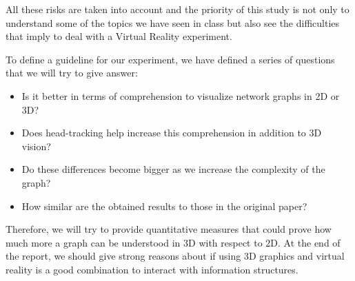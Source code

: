 All these risks are taken into account and the priority of this study is
not only to understand some of the topics we have seen in class but also
see the difficulties that imply to deal with a Virtual Reality
experiment.

To define a guideline for our experiment, we have defined a series of
questions that we will try to give answer:

\begin{itemize}
\item
  Is it better in terms of comprehension to visualize network graphs in
  2D or 3D?
\item
  Does head-tracking help increase this comprehension in addition to 3D
  vision?
\item
  Do these differences become bigger as we increase the complexity of
  the graph?
\item
  How similar are the obtained results to those in the original paper?
\end{itemize}

Therefore, we will try to provide quantitative measures that could prove
how much more a graph can be understood in 3D with respect to 2D. At the
end of the report, we should give strong reasons about if using 3D
graphics and virtual reality is a good combination to interact with
information structures.
